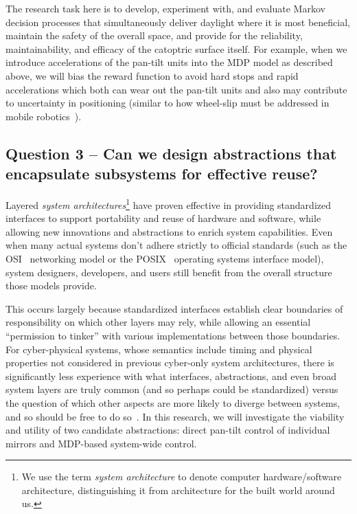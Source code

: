 The research task here is to develop, experiment with, and evaluate
Markov decision processes that simultaneously deliver daylight where it
is most beneficial, maintain the safety of the overall space,
and provide for the reliability, maintainability, and efficacy of the
catoptric surface itself.  For example, when we introduce accelerations
of the pan-tilt units into the MDP model as described above, we will bias
the reward function to avoid hard stops and rapid accelerations which both
can wear out the pan-tilt units and also may contribute to uncertainty in
positioning (similar to how wheel-slip must be addressed in mobile
robotics~\cite{mn87}).

\subsection{Question 3 -- Can we design abstractions that encapsulate
subsystems for effective reuse?}

Layered \emph{system architectures}\footnote{We use the term
\emph{system architecture}
to denote computer hardware/software architecture, distinguishing it from
architecture for the built world around us.}
have proven effective in providing standardized interfaces to
support portability and reuse of hardware and software,
while allowing new innovations and abstractions
to enrich system capabilities.
Even when many actual systems don't adhere strictly to official standards
(such as the OSI~\cite{osi} networking model or the POSIX~\cite{posix} operating
systems interface model), system designers, developers,
and users still benefit from the overall structure those models provide.

This occurs largely because standardized interfaces establish clear
boundaries of responsibility on which other layers may rely, while 
allowing an essential ``permission to tinker'' with various 
implementations between those boundaries. For cyber-physical systems, 
whose semantics include timing and physical properties not considered 
in previous cyber-only system architectures, there is significantly 
less experience with what interfaces, abstractions, and even broad 
system layers are truly common (and so perhaps could be standardized) 
versus the question of which other aspects are more likely to diverge 
between systems, and so should be free to do so~\cite{cag18}.
In this research, we will investigate the viability and utility of
two candidate abstractions: direct pan-tilt control of individual mirrors 
and MDP-based system-wide control.

